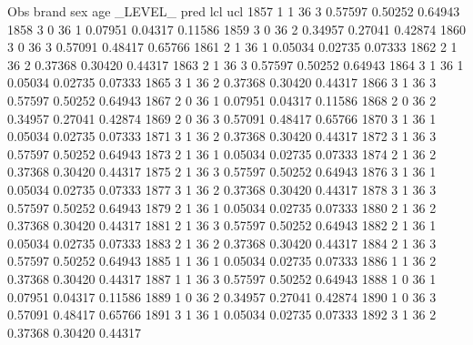 \documentclass{article}
\begin{document}
\begin{Woutput}
 Obs    brand    sex    age    _LEVEL_      pred       lcl        ucl
1857      1       1      36       3       0.57597    0.50252    0.64943
1858      3       0      36       1       0.07951    0.04317    0.11586
1859      3       0      36       2       0.34957    0.27041    0.42874
1860      3       0      36       3       0.57091    0.48417    0.65766
1861      2       1      36       1       0.05034    0.02735    0.07333
1862      2       1      36       2       0.37368    0.30420    0.44317
1863      2       1      36       3       0.57597    0.50252    0.64943
1864      3       1      36       1       0.05034    0.02735    0.07333
1865      3       1      36       2       0.37368    0.30420    0.44317
1866      3       1      36       3       0.57597    0.50252    0.64943
1867      2       0      36       1       0.07951    0.04317    0.11586
1868      2       0      36       2       0.34957    0.27041    0.42874
1869      2       0      36       3       0.57091    0.48417    0.65766
1870      3       1      36       1       0.05034    0.02735    0.07333
1871      3       1      36       2       0.37368    0.30420    0.44317
1872      3       1      36       3       0.57597    0.50252    0.64943
1873      2       1      36       1       0.05034    0.02735    0.07333
1874      2       1      36       2       0.37368    0.30420    0.44317
1875      2       1      36       3       0.57597    0.50252    0.64943
1876      3       1      36       1       0.05034    0.02735    0.07333
1877      3       1      36       2       0.37368    0.30420    0.44317
1878      3       1      36       3       0.57597    0.50252    0.64943
1879      2       1      36       1       0.05034    0.02735    0.07333
1880      2       1      36       2       0.37368    0.30420    0.44317
1881      2       1      36       3       0.57597    0.50252    0.64943
1882      2       1      36       1       0.05034    0.02735    0.07333
1883      2       1      36       2       0.37368    0.30420    0.44317
1884      2       1      36       3       0.57597    0.50252    0.64943
1885      1       1      36       1       0.05034    0.02735    0.07333
1886      1       1      36       2       0.37368    0.30420    0.44317
1887      1       1      36       3       0.57597    0.50252    0.64943
1888      1       0      36       1       0.07951    0.04317    0.11586
1889      1       0      36       2       0.34957    0.27041    0.42874
1890      1       0      36       3       0.57091    0.48417    0.65766
1891      3       1      36       1       0.05034    0.02735    0.07333
1892      3       1      36       2       0.37368    0.30420    0.44317

\end{Woutput}
\end{document}
